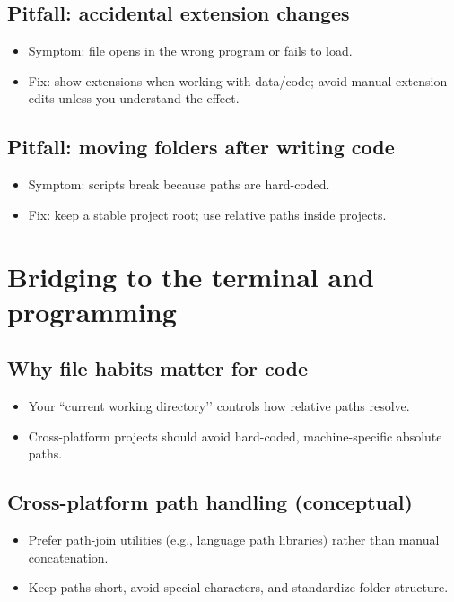 \subsection{Pitfall: accidental extension changes}
\begin{itemize}
\item Symptom: file opens in the wrong program or fails to load.
\item Fix: show extensions when working with data/code; avoid manual extension edits unless you understand the effect.
\end{itemize}

\subsection{Pitfall: moving folders after writing code}
\begin{itemize}
\item Symptom: scripts break because paths are hard-coded.
\item Fix: keep a stable project root; use relative paths inside projects.
\end{itemize}

\section{Bridging to the terminal and programming}
\subsection{Why file habits matter for code}
\begin{itemize}
\item Your ``current working directory’’ controls how relative paths resolve.
\item Cross-platform projects should avoid hard-coded, machine-specific absolute paths.
\end{itemize}

\subsection{Cross-platform path handling (conceptual)}
\begin{itemize}
\item Prefer path-join utilities (e.g., language path libraries) rather than manual concatenation.
\item Keep paths short, avoid special characters, and standardize folder structure.
\end{itemize}

